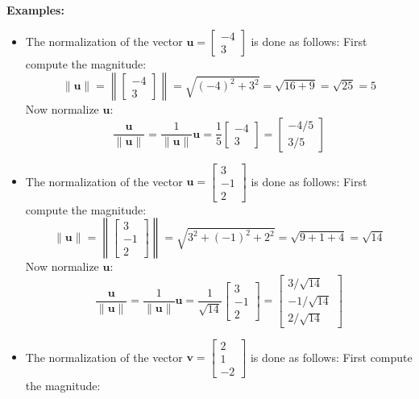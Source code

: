 \documentclass{article}
\begin{document}
\textbf{Examples:}
\begin{itemize}
\item The normalization of the vector \(\mathbf{u} = \begin{bmatrix} -4 \\ 3 \end{bmatrix}\) is done as follows: First compute the magnitude:
\[\|\mathbf{u}\| = \left\|\begin{bmatrix} -4 \\ 3 \end{bmatrix}\right\| = \sqrt{(-4)^2 + 3^2} = \sqrt{16 + 9} = \sqrt{25} = 5\]  
Now normalize \(\mathbf{u}\):
\[\frac{\mathbf{u}}{\|\mathbf{u}\|} 
= \frac{1}{\|\mathbf{u}\|}\mathbf{u}   
= \frac{1}{5}\begin{bmatrix} -4 \\ 3 \end{bmatrix}
= \begin{bmatrix} -4/5 \\ 3/5 \end{bmatrix}\]
\item The normalization of the vector \(\mathbf{u} = \begin{bmatrix} 3 \\ -1 \\ 2 \end{bmatrix}\) is done as follows: First compute the magnitude:
\[\|\mathbf{u}\| = \left\|\begin{bmatrix} 3 \\ -1 \\ 2 \end{bmatrix}\right\| = \sqrt{3^2 + (-1)^2 + 2^2} = \sqrt{9 + 1 + 4} = \sqrt{14}\]  
Now normalize \(\mathbf{u}\):
\[\frac{\mathbf{u}}{\|\mathbf{u}\|} 
= \frac{1}{\|\mathbf{u}\|}\mathbf{u}   
= \frac{1}{\sqrt{14}}\begin{bmatrix} 3 \\ -1 \\ 2 \end{bmatrix}
= \begin{bmatrix} 3/\sqrt{14} \\ -1/\sqrt{14} \\ 2/\sqrt{14} \end{bmatrix}\]
\item The normalization of the vector \(\mathbf{v} = \begin{bmatrix} 2 \\ 1 \\ -2 \end{bmatrix}\) is done as follows: First compute the magnitude:

\end{itemize}
\end{document}
